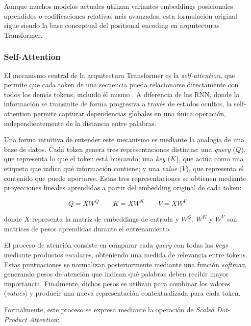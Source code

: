 Aunque muchos modelos actuales utilizan variantes embeddings posicionales aprendidos o codificaciones relativas más avanzadas, esta formulación original sigue siendo la base conceptual del positional encoding en arquitecturas Transformer.

\subsubsection{Self-Attention}

El mecanismo central de la arquitectura Transformer es la \textit{self-attention}, que permite que cada token de una secuencia pueda relacionarse directamente con todos los demás tokens, incluido él mismo . A diferencia de las RNN, donde la información se transmite de forma progresiva a través de estados ocultos, la self-attention permite capturar dependencias globales en una única operación, independientemente de la distancia entre palabras.

Una forma intuitiva de entender este mecanismo es mediante la analogía de una base de datos. Cada token genera tres representaciones distintas: una \textit{query} ($Q$), que representa lo que el token está buscando; una \textit{key} ($K$), que actúa como una etiqueta que indica qué información contiene; y una \textit{value} ($V$), que representa el contenido que puede aportarse. Estas tres representaciones se obtienen mediante proyecciones lineales aprendidas a partir del embedding original de cada token:

\begin{equation*}
	Q = XW^Q \hspace{2em} K = XW^K \hspace{2em} V = XW^V
\end{equation*}

donde $X$ representa la matriz de embeddings de entrada y $W^Q$, $W^K$ y $W^V$ son matrices de pesos aprendidas durante el entrenamiento.

El proceso de atención consiste en comparar cada \textit{query} con todas las \textit{keys} mediante productos escalares, obteniendo una medida de relevancia entre tokens. Estas puntuaciones se normalizan posteriormente mediante una función \textit{softmax}, generando pesos de atención que indican qué palabras deben recibir mayor importancia. Finalmente, dichos pesos se utilizan para combinar los valores (\textit{values}) y producir una nueva representación contextualizada para cada token.

Formalmente, este proceso se expresa mediante la operación de \textit{Scaled Dot-Product Attention}:

